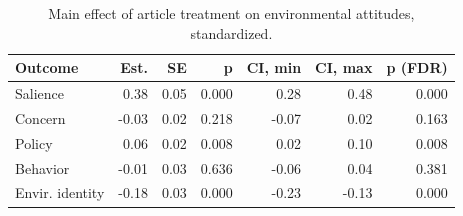 \begin{table}[h!t]
\centering
\begin{tabular}{lrrrrrr}
  \hline
Outcome & Est. & SE & p & CI, min & CI, max & p (FDR) \\ 
  \hline
Salience & 0.38 & 0.05 & 0.000 & 0.28 & 0.48 & 0.000 \\ 
  Concern & -0.03 & 0.02 & 0.218 & -0.07 & 0.02 & 0.163 \\ 
  Policy & 0.06 & 0.02 & 0.008 & 0.02 & 0.10 & 0.008 \\ 
  Behavior & -0.01 & 0.03 & 0.636 & -0.06 & 0.04 & 0.381 \\ 
  Envir. identity & -0.18 & 0.03 & 0.000 & -0.23 & -0.13 & 0.000 \\ 
   \hline
\end{tabular}
\caption{Main effect of article treatment on environmental attitudes, standardized.} 
\label{tab:main_stand}
\end{table}

